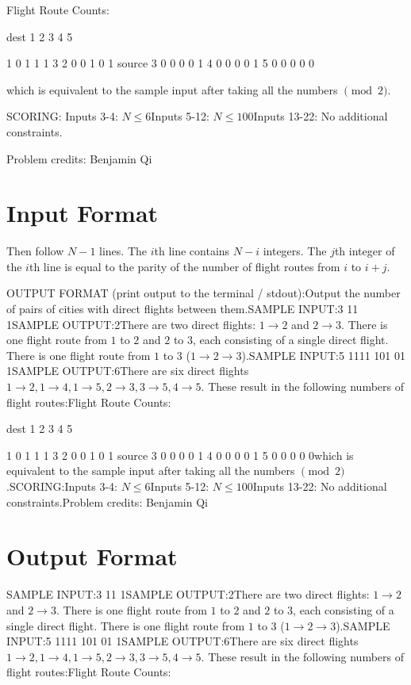\documentclass[12pt]{article}
\begin{document}
Flight Route Counts:

            dest
          1 2 3 4 5

       1  0 1 1 1 3 
       2  0 0 1 0 1 
source 3  0 0 0 0 1 
       4  0 0 0 0 1 
       5  0 0 0 0 0

which is equivalent to the sample input after taking all the numbers $\pmod{2}$.

SCORING:
Inputs 3-4: $N\le 6$Inputs 5-12: $N\le 100$Inputs 13-22: No additional constraints.


Problem credits: Benjamin Qi



\section*{Input Format}
Then follow $N-1$ lines. The $i$th line contains $N-i$ integers. The $j$th 
integer of the $i$th line is equal to the parity of the number of flight routes
from $i$ to $i+j$.

OUTPUT FORMAT (print output to the terminal / stdout):Output the number of pairs of cities with direct flights between them.SAMPLE INPUT:3
11
1SAMPLE OUTPUT:2There are two direct flights: $1\to 2$ and $2\to 3$. There is one flight route
from $1$ to $2$ and $2$ to $3$, each consisting of a single direct flight. There
is one flight route from $1$ to $3$ ($1\to 2\to 3$).SAMPLE INPUT:5
1111
101
01
1SAMPLE OUTPUT:6There are six direct flights $1\to 2, 1\to 4, 1\to 5, 2\to 3, 3\to 5, 4\to 5$.
These result in the following numbers of flight routes:Flight Route Counts:

            dest
          1 2 3 4 5

       1  0 1 1 1 3 
       2  0 0 1 0 1 
source 3  0 0 0 0 1 
       4  0 0 0 0 1 
       5  0 0 0 0 0which is equivalent to the sample input after taking all the numbers $\pmod{2}$.SCORING:Inputs 3-4: $N\le 6$Inputs 5-12: $N\le 100$Inputs 13-22: No additional constraints.Problem credits: Benjamin Qi

\section*{Output Format}
SAMPLE INPUT:3
11
1SAMPLE OUTPUT:2There are two direct flights: $1\to 2$ and $2\to 3$. There is one flight route
from $1$ to $2$ and $2$ to $3$, each consisting of a single direct flight. There
is one flight route from $1$ to $3$ ($1\to 2\to 3$).SAMPLE INPUT:5
1111
101
01
1SAMPLE OUTPUT:6There are six direct flights $1\to 2, 1\to 4, 1\to 5, 2\to 3, 3\to 5, 4\to 5$.
These result in the following numbers of flight routes:Flight Route Counts:
\end{document}
